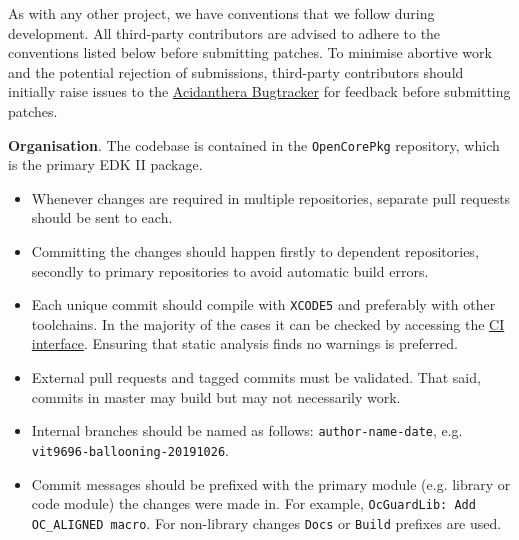 \documentclass[]{article}
\providecommand{\tightlist}{%
  \setlength{\itemsep}{0pt}\setlength{\parskip}{0pt}}
\begin{document}
As with any other project, we have conventions that we follow during development.
All third-party contributors are advised to adhere to the conventions listed below
before submitting patches. To minimise abortive work and the potential rejection of
submissions, third-party contributors should initially raise issues to the
\href{https://github.com/acidanthera/bugtracker}{Acidanthera Bugtracker}
for feedback before submitting patches.

\textbf{Organisation}. The codebase is contained in the \texttt{OpenCorePkg} repository,
which is the primary EDK II package.
\begin{itemize}
\tightlist
\item Whenever changes are required in multiple repositories, separate pull requests should
be sent to each.
\item Committing the changes should happen firstly to dependent repositories, secondly to
primary repositories to avoid automatic build errors.
\item Each unique commit should compile with \texttt{XCODE5} and preferably with other
toolchains. In the majority of the cases it can be checked by accessing the
\href{https://travis-ci.com/acidanthera}{CI interface}. Ensuring that static analysis finds
no warnings is preferred.
\item External pull requests and tagged commits must be validated. That said, commits in
master may build but may not necessarily work.
\item Internal branches should be named as follows: \texttt{author-name-date}, e.g.
\texttt{vit9696-ballooning-20191026}.
\item Commit messages should be prefixed with the primary module (e.g. library or code module) the
changes were made in. For example, \texttt{OcGuardLib: Add OC\_ALIGNED macro}. For non-library changes
\texttt{Docs} or \texttt{Build} prefixes are used.
\end{itemize}
\end{document}
